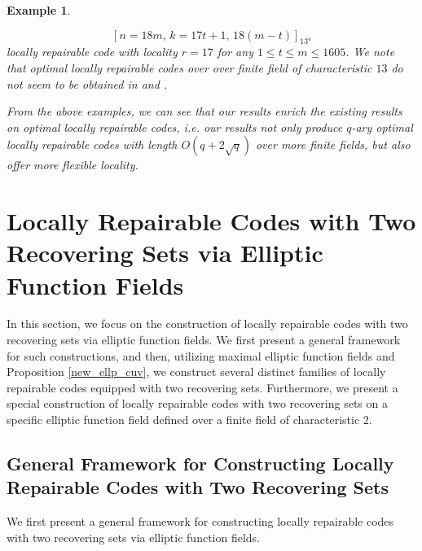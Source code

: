 \documentclass[journal,12pt,onecolumn]{IEEEtran}
\newtheorem{example}{Example}
\begin{document}
\begin{example}
\begin{itemize}
        \[
            [n=18m,\,k=17t+1,\,18(m-t)]_{13^4}
        \]
        locally repairable code with locality \(r = 17\) for any \(1\le t\le m\le1605\). We note that optimal locally repairable codes over over finite field of characteristic \(13\) do not seem to be obtained in \cite{Optimal_Locally_Repairable_Codes_Via_Elliptic_Curves} and \cite{MA2023105686}.
    \end{itemize}

    From the above examples, we can see that our results enrich the existing results on optimal locally repairable codes, i.e. our results not only produce \(q\)-ary optimal locally repairable codes with length \(O(q+2\sqrt{q})\) over more finite fields, but also offer more flexible locality. 
\end{example}











\section{Locally Repairable Codes with Two Recovering Sets via Elliptic Function Fields}\label{construct_two} 

In this section, we focus on the construction of locally repairable codes with two recovering sets via elliptic function fields. We first present a general framework for such constructions, and then, utilizing maximal elliptic function fields and Proposition \ref{new_ellp_cuv}, we construct several distinct families of locally repairable codes equipped with two recovering sets. Furthermore, we present a special construction of locally repairable codes with two recovering sets on a specific elliptic function field defined over a finite field of characteristic \(2\). 

\subsection{General Framework for Constructing Locally Repairable Codes with Two Recovering Sets}

We first present a general framework for constructing locally repairable codes with two recovering sets via elliptic function fields. 
\end{document}
